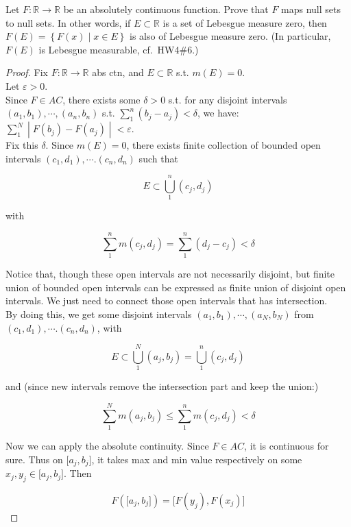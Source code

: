Let \(F:\mathbb{R}\rightarrow\mathbb{R}\) be an absolutely continuous function. Prove that \(F\) maps null sets to null sets. In other words, if \(E \subset \mathbb{R}\) is a set of Lebesgue measure zero, then \(F(E) = \left\{ {F(x) \mid x \in E} \right\}\) is also of Lebesgue measure zero. (In particular, \(F(E)\) is Lebesgue measurable, cf.~HW4\#6.)

\begin{proof}

Fix \(F:\mathbb{R}\rightarrow\mathbb{R}\) abs ctn, and \(E \subset \mathbb{R}\) s.t. \(m(E) = 0\).\\
Let \(\varepsilon > 0\).\\
Since \(F \in AC\), there exists some \(\delta > 0\) s.t. for any disjoint intervals \((a_{1},b_{1}),\cdots,(a_{n},b_{n})\) s.t. \(\sum_{1}^{n}(b_{j} - a_{j}) < \delta\), we have: \(\left. \sum_{1}^{N} \middle| F(b_{j}) - F(a_{j}) \middle| < \varepsilon \right.\).\\
Fix this \(\delta\). Since \(m(E) = 0\), there exists finite collection of bounded open intervals \((c_{1},d_{1}),\cdots.(c_{n},d_{n})\) such that

\[E \subset \bigcup\limits_{1}^{n}(c_{j},d_{j})\]

with

\[\sum\limits_{1}^{n}m(c_{j},d_{j}) = \sum\limits_{1}^{n}(d_{j} - c_{j}) < \delta\]

Notice that, though these open intervals are not necessarily disjoint, but finite union of bounded open intervals can be expressed as finite union of disjoint open intervals. We just need to connect those open intervals that has intersection.\\
By doing this, we get some disjoint intervals \((a_{1},b_{1}),\cdots,(a_{N},b_{N})\) from \((c_{1},d_{1}),\cdots.(c_{n},d_{n})\), with

\[E \subset \bigcup\limits_{1}^{N}(a_{j},b_{j}) = \bigcup\limits_{1}^{n}(c_{j},d_{j})\]

and (since new intervals remove the intersection part and keep the union:)

\[\sum\limits_{1}^{N}m(a_{j},b_{j}) \leq \sum\limits_{1}^{n}m(c_{j},d_{j}) < \delta\]

Now we can apply the absolute continuity. Since \(F \in AC\), it is continuous for sure. Thus on \(\lbrack a_{j},b_{j}\rbrack\), it takes max and min value respectively on some \(x_{j},y_{j} \in \lbrack a_{j},b_{j}\rbrack\). Then

\[F(\lbrack a_{j},b_{j}\rbrack) = \lbrack F(y_{j}),F(x_{j})\rbrack\]


\end{proof}
